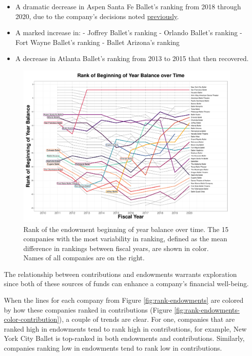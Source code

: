 \documentclass[Dance Data
Project,article,submit,moreauthors,pdftex]{mdpi}
\begin{document}
\begin{itemize}
\item A dramatic decrease in Aspen Santa Fe Ballet’s ranking from 2018 through 2020, due to the company’s decisions noted  \hyperref[sec:asfb]{previously}.
\item A marked increase in: 
\subitem - Joffrey Ballet’s ranking
\subitem - Orlando Ballet’s ranking
\subitem - Fort Wayne Ballet’s ranking
\subitem - Ballet Arizona’s ranking
\item A decrease in Atlanta Ballet’s ranking from 2013 to 2015 that then recovered.
\end{itemize}

\begin{figure}[H]
\includegraphics[width=0.9\linewidth,]{../images/rank_of_beginning_year_balance} \caption{\label{fig:rank-endowments}Rank of the endowment beginning of year balance over time. The 15 companies with the most variability in ranking, defined as the mean difference in rankings between fiscal years, are shown in color. Names of all companies are on the right.}\label{fig:rank-og-beginning-year-balance}
\end{figure}

The relationship between contributions and endowments warrants
exploration since both of these sources of funds can enhance a company's
financial well-being.

When the lines for each company from Figure \ref{fig:rank-endowments}
are colored by how these companies ranked in contributions (Figure
\ref{fig:rank-endowments-color-contribution}), a couple of trends are
clear. For one, companies that are ranked high in endowments tend to
rank high in contributions, for example, New York City Ballet is
top-ranked in both endowments and contributions. Similarly, companies
ranking low in endowments tend to rank low in contributions.
\end{document}

